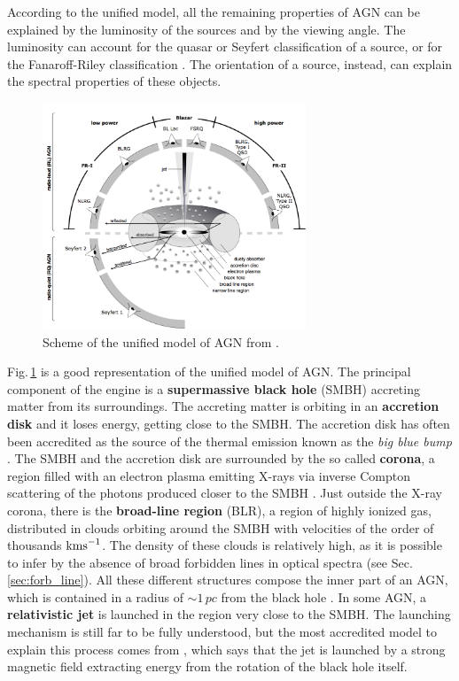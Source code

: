 \documentclass[../main.tex]{subfiles}
\begin{document}
According to the unified model, all the remaining properties of AGN can be explained by the luminosity of the sources and by the viewing angle.
The luminosity can account for the quasar or Seyfert classification of a source, or for the Fanaroff-Riley classification \citep{Fanaroff74}.
The orientation of a source, instead, can explain the spectral properties of these objects.

\begin{figure}
\centering
\includegraphics[width=0.7\textwidth]{images/AGNmodel.png} 
\caption[]{Scheme of the unified model of AGN from \citet{Beckmann12}. }
\label{fig:unified_model}
\end{figure}

Fig.\,\ref{fig:unified_model} is a good representation of the unified model of AGN.
The principal component of the engine is a \textbf{supermassive black hole} (SMBH) accreting matter from its surroundings.
The accreting matter is orbiting in an \textbf{accretion disk} and it loses energy, getting close to the SMBH.
The accretion disk has often been accredited as the source of the thermal emission known as the \emph{big blue bump} \citep[e.g.][]{Shang05}.
The SMBH and the accretion disk are surrounded by the so called \textbf{corona}, a region filled with an electron plasma emitting X-rays via inverse Compton scattering of the photons produced closer to the SMBH \citep{Haardt91}.
Just outside the X-ray corona, there is the \textbf{broad-line region} (BLR), a region of highly ionized gas, distributed in clouds orbiting around the SMBH with velocities of the order of thousands $\si{\kms}$. 
The density of these clouds is relatively high, as it is possible to infer by the absence of broad forbidden lines in optical spectra (see Sec.\,\ref{sec:forb_line}).
All these different structures compose the inner part of an AGN, which is contained in a radius of $\sim 1\,\si{pc}$ from the black hole \citep{Beckmann12}.
In some AGN, a \textbf{relativistic jet} is launched in the region very close to the SMBH. 
The launching mechanism is still far to be fully understood, but the most accredited model to explain this process comes from \citet{Blandford77}, which says that the jet is launched by a strong magnetic field extracting energy from the rotation of the black hole itself.
\end{document}
